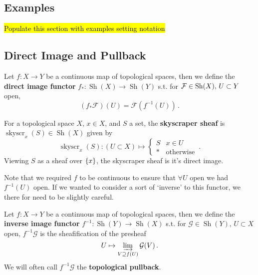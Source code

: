 \documentclass{article}
\begin{document}
\subsection{Examples}
\hl{Populate this section with examples setting notation}


\subsection{Direct Image and Pullback}

\begin{definition}
	Let $f:X\to Y$ be a continuous map of topological spaces, then we define the \textbf{direct image functor} $f_\ast : \operatorname{Sh}(X) \to \operatorname{Sh}(Y)$ s.t. for $\mathcal{F} \in \operatorname{Sh}(X), \, U \subset Y$ open, 
	\[
	(f_\ast \mathcal{F})(U) = \mathcal{F}(f^{-1}(U)) \, .
	\]
\end{definition}

\begin{example}
	For a topological space $X$, $x \in X$, and $S$ a set, the \textbf{skyscraper sheaf} is $\operatorname{skyscr}_x(S) \in \operatorname{Sh}(X)$ given by 
	\[
	\operatorname{skyscr}_x(S): (U \subset X) \mapsto \left \lbrace \begin{array}{cc}
	S & x \in U \\ \ast & \text{otherwise}
	\end{array} \right. \, .
	\]
	Viewing $S$ as a sheaf over $\left\{ x \right\}$, the skyscraper sheaf is it's direct image.  
\end{example}

\begin{remark}
	Note that we required $f$ to be continuous to ensure that $\forall U$ open we had $f^{-1}(U)$ open. If we wanted to consider a sort of `inverse' to this functor, we there for need to be slightly careful. 
\end{remark}

\begin{definition}
	Let $f:X\to Y$ be a continuous map of topological spaces, then we define the \textbf{inverse image functor} $f^{-1} : \operatorname{Sh}(Y) \to \operatorname{Sh}(X)$ s.t. for $\mathcal{G} \in \operatorname{Sh}(Y), \, U \subset X$ open, $f^{-1}\mathcal{G}$ is the sheafification of the presheaf 
	\[
	U \mapsto \varinjlim_{V \supseteq f(U)} \mathcal{G}(V) \, .
	\]
	We will often call $f^{-1}\mathcal{G}$ the \textbf{topological pullback}.
\end{definition}
\end{document}
